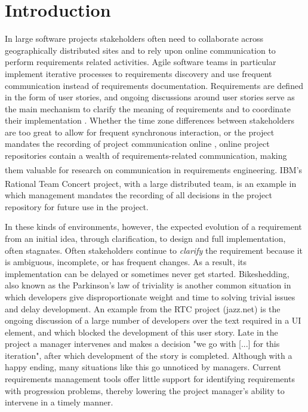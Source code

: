 \section{Introduction}

In  large software projects stakeholders often need to collaborate across geographically distributed sites and to rely upon online communication to perform requirements related activities. Agile software teams in particular implement iterative processes to requirements discovery and use frequent communication instead of requirements documentation. 
Requirements are defined in the form of user stories, and ongoing discussions around user stories serve as the main mechanism to clarify the meaning of requirements and to coordinate their implementation \cite{Cao2008}. Whether the time zone differences between stakeholders are too great to allow for frequent synchronous interaction, or the project mandates the recording of project communication online  \cite{Frost2007}, online project repositories contain a wealth of requirements-related communication, making them valuable for research on communication in requirements engineering. 
IBM\textsuperscript{\textregistered}'s Rational Team Concert\textsuperscript{\textregistered} project, with a large distributed team, is an example in which management mandates the recording of all decisions in the project repository for future use in the project\cite{Frost2007}. 

In these kinds of environments, however, the expected evolution of a requirement from an initial idea, through clarification, to design and full implementation, often stagnates. 
Often stakeholders continue to \emph{clarify} the requirement because it is ambiguous, incomplete, or has frequent changes. As a result, its implementation can be delayed or sometimes never get started. Bikeshedding, also known as the Parkinson's law of triviality\cite{Parkinson1958} is another common situation in which developers give disproportionate weight and time to solving trivial issues and delay development. An example from the RTC project (jazz.net) is the ongoing discussion of a large number of developers over the  text required in a UI element, and which blocked the development of this user story. Late in the project a manager intervenes and makes a decision "we go with [...] for this iteration", after which development of the story is completed. Although with a happy ending, many situations like this go unnoticed by managers. Current requirements management tools offer little support for identifying requirements with progression problems, thereby lowering the project manager's  ability to intervene in a timely manner.

